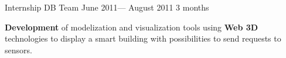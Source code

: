 \jobposition%
{Internship}%
{DB Team}
{June 2011--- August 2011}%
{3 months}%
{
	\textbf{Development} of modelization and visualization tools using
	\textbf{Web 3D} technologies to display a smart building with
	possibilities to send requests to sensors.
	\vspace{0.5em}

}
